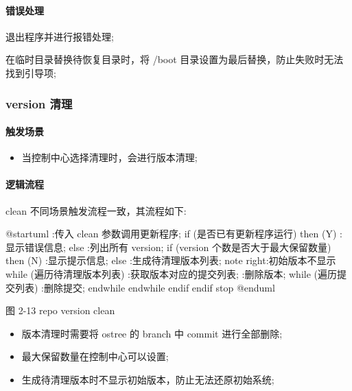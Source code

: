 \documentclass{utart}
\begin{document}
\paragraph{错误处理}
\begin{description}[leftmargin=!]
  \item[根路径未获取到:] 退出程序并进行报错处理;
  \item[在 initramfs 回滚时异常:] 在临时目录替换待恢复目录时，将 /boot 目录设置为最后替换，防止失败时无法找到引导项;
\end{description}

\subsubsection{version 清理}
\paragraph{触发场景}
\begin{itemize}[leftmargin=4em]
  \item 当控制中心选择清理时，会进行版本清理;
\end{itemize}

\paragraph{逻辑流程}
clean 不同场景触发流程一致，其流程如下:
\begin{center}
  \begin{adjustbox}{scale=0.65}
    \begin{plantuml}
      @startuml
      :传入 clean 参数调用更新程序;
      if (是否已有更新程序运行) then (Y)
      :显示错误信息;
      else
      :列出所有 version;
      if (version 个数是否大于最大保留数量) then (N)
      :显示提示信息;
      else
      :生成待清理版本列表;
      note right:初始版本不显示
      while (遍历待清理版本列表)
      :获取版本对应的提交列表;
      :删除版本;
      while (遍历提交列表)
      :删除提交;
      endwhile
      endwhile
      endif
      endif
      stop
      @enduml
    \end{plantuml}
  \end{adjustbox}

  图 2-13 repo version clean
\end{center}
\begin{itemize}[leftmargin=4em]
  \item 版本清理时需要将 ostree 的 branch 中 commit 进行全部删除;
  \item 最大保留数量在控制中心可以设置;
  \item 生成待清理版本时不显示初始版本，防止无法还原初始系统;
\end{itemize}
\end{document}
